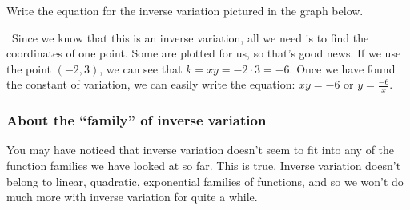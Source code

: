 \begin{boxedex}
Write the equation for the inverse variation pictured in the graph below.

\begin{center}
\end{center}


\exsoln\ Since we know that this is an inverse variation, all we need is to find the coordinates of one point. Some are plotted for us, so that's good news. If we use the point $(-2, 3)$, we can see that $k = xy = -2\cdot3 = -6$. Once we have found the constant of variation, we can easily write the equation: $xy=-6$ or $y=\frac{-6}{x}$.
\end{boxedex}

\subsubsection{About the ``family'' of inverse variation}

You may have noticed that inverse variation doesn't seem to fit into any of the function families we have looked at so far. This is true. Inverse variation doesn't belong to linear, quadratic, exponential families of functions, and so we won't do much more with inverse variation for quite a while.

